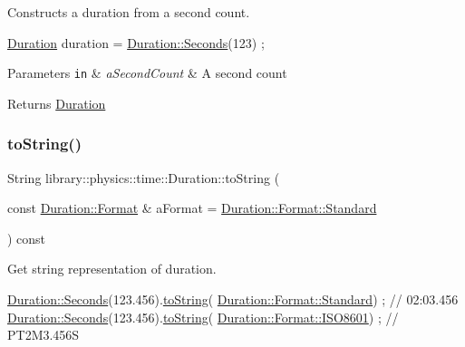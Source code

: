 Constructs a duration from a second count. 


\begin{DoxyCode}
\hyperlink{classlibrary_1_1physics_1_1time_1_1_duration_a0a70efcf487a841da572afcf00001f64}{Duration} duration = \hyperlink{classlibrary_1_1physics_1_1time_1_1_duration_ae10891c94a1b2278c444cb44b37132f1}{Duration::Seconds}(123) ;
\end{DoxyCode}



\begin{DoxyParams}[1]{Parameters}
\mbox{\tt in}  & {\em a\+Second\+Count} & A second count \\
\hline
\end{DoxyParams}
\begin{DoxyReturn}{Returns}
\hyperlink{classlibrary_1_1physics_1_1time_1_1_duration}{Duration} 
\end{DoxyReturn}
\mbox{\label{classlibrary_1_1physics_1_1time_1_1_duration_a06f24e6cc8cb867abbae969c5f199513}} 
\subsubsection{\texorpdfstring{to\+String()}{toString()}}
{\footnotesize\ttfamily String library\+::physics\+::time\+::\+Duration\+::to\+String (\begin{DoxyParamCaption}\item[{const \hyperlink{classlibrary_1_1physics_1_1time_1_1_duration_ace85659cafe97df992c0e4273bdc88d1}{Duration\+::\+Format} \&}]{a\+Format = {\ttfamily \hyperlink{classlibrary_1_1physics_1_1time_1_1_duration_ace85659cafe97df992c0e4273bdc88d1aeb6d8ae6f20283755b339c0dc273988b}{Duration\+::\+Format\+::\+Standard}} }\end{DoxyParamCaption}) const}



Get string representation of duration. 


\begin{DoxyCode}
\hyperlink{classlibrary_1_1physics_1_1time_1_1_duration_ae10891c94a1b2278c444cb44b37132f1}{Duration::Seconds}(123.456).\hyperlink{classlibrary_1_1physics_1_1time_1_1_duration_a06f24e6cc8cb867abbae969c5f199513}{toString}(
      \hyperlink{classlibrary_1_1physics_1_1time_1_1_duration_ace85659cafe97df992c0e4273bdc88d1aeb6d8ae6f20283755b339c0dc273988b}{Duration::Format::Standard}) ; \textcolor{comment}{// 02:03.456}
\hyperlink{classlibrary_1_1physics_1_1time_1_1_duration_ae10891c94a1b2278c444cb44b37132f1}{Duration::Seconds}(123.456).\hyperlink{classlibrary_1_1physics_1_1time_1_1_duration_a06f24e6cc8cb867abbae969c5f199513}{toString}(
      \hyperlink{classlibrary_1_1physics_1_1time_1_1_duration_ace85659cafe97df992c0e4273bdc88d1a35b6786739efcdc5a74ab1dca29d3b6b}{Duration::Format::ISO8601}) ; \textcolor{comment}{// PT2M3.456S}
\end{DoxyCode}



